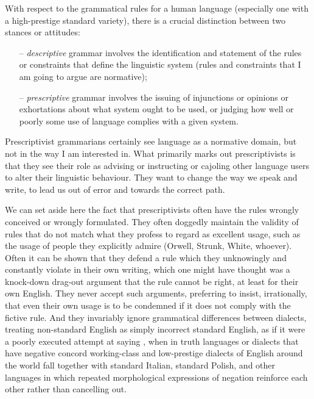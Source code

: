 \documentclass[output=paper]{langscibook}
\begin{document}
With respect to the grammatical rules for a human language (especially one with a high-prestige standard variety), there is a crucial distinction between two stances or attitudes:

\begin{itemize} 
\item[--] \emph{descriptive} grammar involves the identification and statement of the rules or constraints that define the linguistic system (rules and constraints that I am going to argue are normative); 
\item[--] \emph{prescriptive} grammar involves the issuing of injunctions or opinions or exhortations about what system ought to be used, or judging how well or poorly some use of language complies with a given system. 
\end{itemize} 

Prescriptivist grammarians certainly see language as a normative domain, but not in the way I am interested in. What primarily marks out prescriptivists is that they see their role as advising or instructing or cajoling other language users to alter their linguistic behaviour.  They want to change the way we speak and write, to lead us out of error and towards the correct path.

We can set aside here the fact that prescriptivists often have the rules wrongly conceived or wrongly formulated.  They often doggedly maintain the validity of rules that do not match what they profess to regard as excellent usage, such as the usage of people they explicitly admire (Orwell, Strunk, White, whoever).  Often it can be shown that they defend a rule which they unknowingly and constantly violate in their own writing, which one might have thought was a knock-down drag-out argument that the rule cannot be right, at least for their own English.  They never accept such arguments, preferring to insist, irrationally, that even their own usage is to be condemned if it does not comply with the fictive rule. And they invariably ignore grammatical differences between dialects, treating non-standard English  as simply incorrect standard English, as if it were a poorly executed attempt at saying , when in truth languages or dialects that have negative concord working-class and low-prestige dialects of English around the world fall together with standard Italian, standard Polish, and other languages in which repeated morphological expressions of negation reinforce each other rather than cancelling out.
\end{document}
